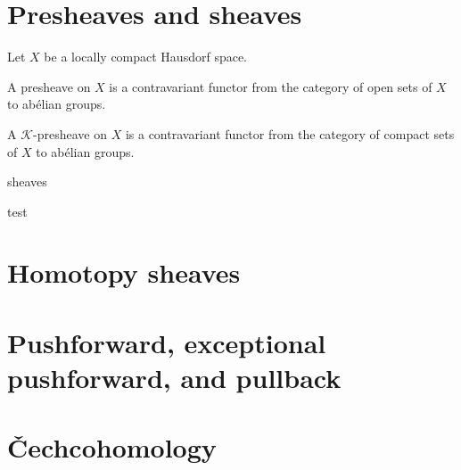 %


\chapter{Presheaves and sheaves}

Let $X$ be a locally compact Hausdorf space.

\begin{definition}
    \label{def:pre_sheaves}
    A presheave on $X$ is a contravariant functor from the category of open sets of $X$ to abélian groups.
\end{definition}

\begin{definition}
    \label{def:K_pre_sheaves}
    A $\mathcal{K}$-presheave on $X$ is a contravariant functor from the category of compact sets of $X$ to abélian groups.
\end{definition}

\begin{definition}
    \label{def:sheaves}
    sheaves
\end{definition}

\begin{theorem}
    test

\end{theorem}


\chapter{Homotopy sheaves}

\chapter{Pushforward, exceptional pushforward, and pullback}

\chapter{\v{C}echcohomology}


